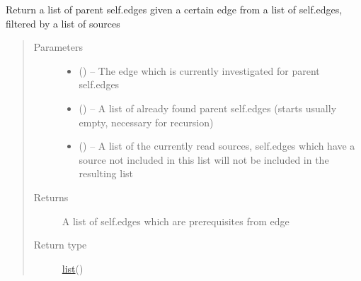 \documentclass[letterpaper,10pt,english]{sphinxmanual}
\begin{document}
\begin{fulllineitems}
\begin{fulllineitems}
\end{fulllineitems}


\begin{fulllineitems}
\label{\detokenize{concept_map:concept_map.ConceptMap.find_prerequisites}}
Return a list of parent self.edges given a certain edge from a list of self.edges, filtered by a list of sources
\begin{quote}\begin{description}
\item[{Parameters}] \leavevmode\begin{itemize}
\item {} 
 ({\hyperref[\detokenize{edge:edge.Edge}]{}}) -- The edge which is currently investigated for parent self.edges

\item {} 
 (\href{https://docs.python.org/2/library/functions.html\#list}{}\sphinxstyleliteralemphasis{)}\sphinxstyleliteralemphasis{}) -- A list of already found parent self.edges (starts usually empty, necessary for recursion)

\item {} 
 (\href{https://docs.python.org/2/library/functions.html\#list}{}\sphinxstyleliteralemphasis{(}\href{https://docs.python.org/2/library/string.html\#module-string}{}\sphinxstyleliteralemphasis{)}\sphinxstyleliteralemphasis{}) -- A list of the currently read sources, self.edges which have a source not included in this list  will not be included in the resulting list

\end{itemize}

\item[{Returns}] \leavevmode
A list of self.edges which are prerequisites from edge

\item[{Return type}] \leavevmode
\href{https://docs.python.org/2/library/functions.html\#list}{list}({\hyperref[\detokenize{edge:module-edge}]{}})


\end{description}
\end{quote}
\end{fulllineitems}
\end{fulllineitems}
\end{document}
